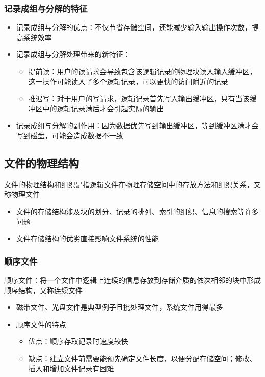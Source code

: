 \documentclass[cs4size,a4paper,10pt]{ctexart}
\begin{document}
	\subsubsection{记录成组与分解的特征}
	\begin{itemize}
		\item 记录成组与分解的优点：不仅节省存储空间，还能减少输入输出操作次数，提高系统效率
		\item 记录成组与分解处理带来的新特征：
		\begin{itemize}
			\item 提前读：用户的读请求会导致包含该逻辑记录的物理块读入输入缓冲区，这一操作可能读入了多个逻辑记录，可以更快的访问附近的记录
			\item 推迟写：对于用户的写请求，逻辑记录首先写入输出缓冲区，只有当该缓冲区中的逻辑记录满后才会引起实际的输出
		\end{itemize}
		\item 记录成组与分解的副作用：因为数据优先写到输出缓冲区，等到缓冲区满才会写到磁盘，可能会造成数据不一致
	\end{itemize}

	\subsection{文件的物理结构}
	文件的物理结构和组织是指逻辑文件在物理存储空间中的存放方法和组织关系，又称物理文件
	\begin{itemize}
		\item 文件的存储结构涉及块的划分、记录的排列、索引的组织、信息的搜索等许多问题
		\item 文件存储结构的优劣直接影响文件系统的性能
	\end{itemize}

	\subsubsection{顺序文件}
	顺序文件：将一个文件中逻辑上连续的信息存放到存储介质的依次相邻的块中形成顺序结构，又称连续文件
	\begin{itemize}
		\item 磁带文件、光盘文件是典型例子且批处理文件，系统文件用得最多
		\item 顺序文件的特点
		\begin{itemize}
			\item 优点：顺序存取记录时速度较快
			\item 缺点：建立文件前需要能预先确定文件长度，以便分配存储空间；修改、插入和增加文件记录有困难
		\end{itemize}
	\end{itemize}
\end{document}

